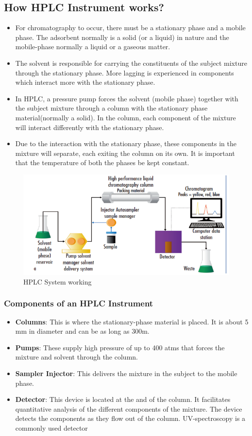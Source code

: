 \documentclass{article}
\begin{document}
\subsection{How HPLC Instrument works?}
\begin{itemize}
\item For chromatography to occur, there must be a stationary phase and a mobile phase. The adsorbent normally is a solid (or a liquid) in nature and the mobile-phase normally a liquid or a gaseous matter.
\item The solvent is responsible for carrying the constituents of the subject mixture through the stationary phase. More lagging is experienced in components which interact more with the stationary phase.
\item In HPLC, a pressure pump forces the solvent (mobile phase) together with the subject mixture through a column with the stationary phase material(normally a solid). In the column, each component of the mixture will interact differently with the stationary phase.
\item Due to the interaction with the stationary phase, these components in the mixture will separate, each exiting the column on its own. It is important that the temperature of both the phases be kept constant.
\end{itemize}
\begin{figure} [h]
    \centering
    \includegraphics[scale=0.75,center]{high-performance-liquid-chromatography-service-1.png}
    \caption{HPLC System working}
    \label{fig:hplc system working}
\end{figure}
\subsubsection{Components of an HPLC Instrument}
\begin{itemize}
\item \textbf{Columns}: This is where the stationary-phase material is placed. It is about 5 mm in diameter and can be as long as 300m.
\item \textbf{Pumps}: These supply high pressure of up to 400 atms that forces the mixture and solvent through the column.
\item \textbf{Sampler Injector}: This delivers the mixture in the subject to the mobile phase.
\item \textbf{Detector}: This device is located at the and of the column. It facilitates quantitative analysis of the different components of the mixture. The device detects the components as they flow out of the column. UV-spectroscopy is a commonly used detector
\end{itemize}
\end{document}
